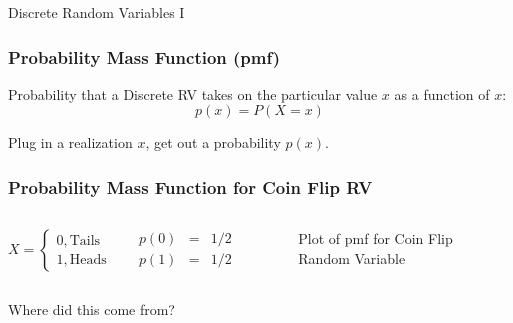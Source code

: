 \documentclass[handout]{beamer}
\begin{document}
\begin{frame}

\centering \Huge Discrete Random Variables I

\end{frame}
\begin{frame}
\frametitle{Probability Mass Function (pmf)}
 Probability that a \alert{Discrete RV} takes on the particular value $x$ as a function of $x$:
 $$p(x) = P(X =x)$$

 

\begin{alertblock}{Plug in a realization $x$, get out a probability  $p(x)$.}\end{alertblock}

 


\end{frame}
\begin{frame}
\frametitle{Probability Mass Function for Coin Flip RV}

\begin{columns}
$$X = \left\{ \begin{array}{l}  0, \mbox{Tails}\\ 1, \mbox{Heads}\end{array} \right.$$

\begin{eqnarray*}
	p(0) &=& 1/2\\
	p(1) &=& 1/2
\end{eqnarray*}


\begin{figure}
\centering
{}
\caption{Plot of pmf for Coin Flip Random Variable}
\end{figure}
\end{columns}

\vspace{3em}
\alert{Where did this come from?}

\end{frame}
\end{document}
